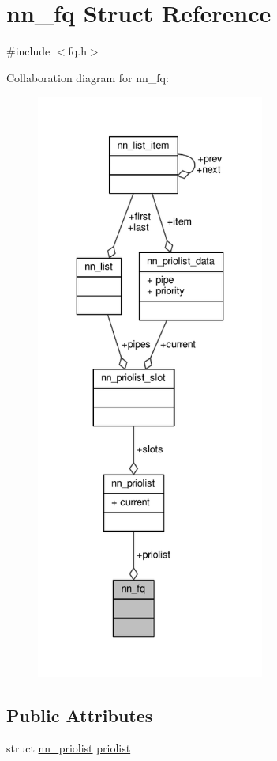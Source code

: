 \hypertarget{structnn__fq}{}\section{nn\+\_\+fq Struct Reference}
\label{structnn__fq}


{\ttfamily \#include $<$fq.\+h$>$}



Collaboration diagram for nn\+\_\+fq\+:\nopagebreak
\begin{figure}[H]
\begin{center}
\leavevmode
\includegraphics[height=550pt]{structnn__fq__coll__graph}
\end{center}
\end{figure}
\subsection*{Public Attributes}
\begin{DoxyCompactItemize}
\item 
struct \hyperlink{structnn__priolist}{nn\+\_\+priolist} \hyperlink{structnn__fq_a5bce08b6089ff9f0ebaf17cf07a45184}{priolist}
\end{DoxyCompactItemize}


